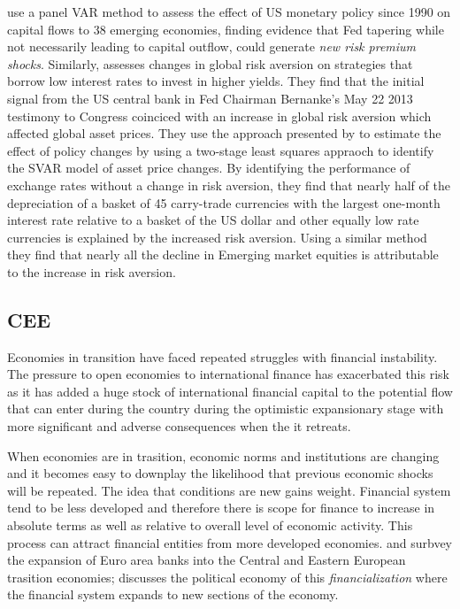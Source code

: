 \documentclass[12pt, a4paper, oneside]{article} %
\begin{document}


 \citet{IMFLatam} use a panel VAR method to assess the effect of US monetary policy since 1990 on capital flows to 38 emerging economies, finding evidence that Fed tapering while not necessarily leading to capital outflow, could generate \emph{new risk premium shocks}.   Similarly, \citet{NYFedtaper} assesses changes in global risk aversion on strategies that borrow low interest rates to invest in higher yields.  They find that the initial signal from the US central bank in Fed Chairman Bernanke's May 22 2013 testimony to Congress coinciced with an increase in global risk aversion which affected global asset prices. They use the approach presented by \citet{MertensSVAR} to estimate the effect of policy changes by using a two-stage least squares appraoch to identify the SVAR model of asset price changes.  By identifying the performance of exchange rates without a change in risk aversion, they find that nearly half of the depreciation of a basket of 45 carry-trade currencies with the largest one-month interest rate relative to a basket of the US dollar and other equally low rate currencies is explained by the increased risk aversion. Using a similar method they find that nearly all the decline in Emerging market equities is attributable to the increase in risk aversion.


\subsection{CEE}
Economies in transition have faced repeated struggles with financial instability.  The pressure to open economies to international finance has exacerbated this risk as it has added a huge stock of international financial capital to the potential flow that can enter during the country during the optimistic expansionary stage with more significant and adverse consequences when the it retreats.

When economies are in trasition, economic norms and institutions are changing and it becomes easy to downplay the likelihood that previous economic shocks will be repeated.  The idea that conditions are new gains weight.  Financial system tend to be less developed and therefore there is scope for finance to increase in absolute terms as well as relative to overall level of economic activity.  This process can attract financial entities from more developed economies. \citet{ONBcarry} and \citet{EBRD} surbvey the expansion of Euro area banks into the Central and Eastern European trasition economies; \citet{Gabor} discusses the political economy of this \emph{financialization} where the financial system expands to new sections of the economy.  
\end{document}
